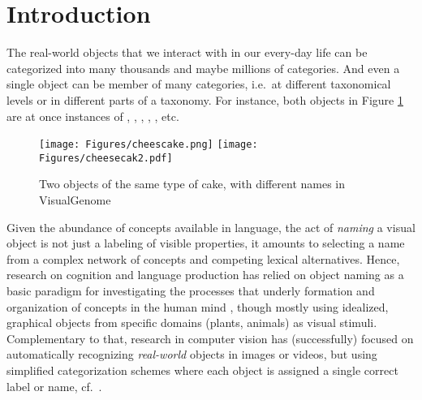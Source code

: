 \section{Introduction}

The real-world objects that we interact with in our every-day life can be categorized into many thousands and maybe millions of categories. And even a single object can be member of many categories, i.e.\ at different taxonomical levels or in different parts of a taxonomy. For instance, both objects in Figure \ref{fig:cake} are at once instances of , , , , ,  etc.

\begin{figure}[htbp]
\begin{center}
\texttt{[image: Figures/cheescake.png]}
\texttt{[image: Figures/cheesecak2.pdf]}
\caption{Two objects of the same type of cake, with different names in VisualGenome}
\label{fig:cake}
\end{center}
\end{figure}


Given the abundance of concepts available in language, the act of \textit{naming} a visual object is not just a labeling of visible properties, it amounts to selecting a name from a complex network of concepts and competing lexical alternatives.
Hence, research on cognition and language production has relied on object naming as a basic paradigm for investigating the processes that underly formation and organization of concepts in the human mind  \cite{rosch1976basic} , though mostly using idealized, graphical objects from specific domains (plants, animals) as visual stimuli.
Complementary to that, research in computer vision has (successfully) focused on automatically recognizing \textit{real-world} objects in images or videos, but using simplified categorization schemes where each object is assigned a single correct label or name, cf.\ \cite{googlenet}. %

